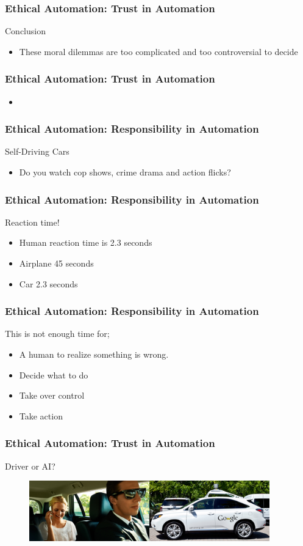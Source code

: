 \begin{frame}
	\frametitle{ Ethical Automation: Trust in Automation}
	{\Large Conclusion}
	\begin{itemize}
		\item These moral dilemmas are too complicated and too controversial to decide
	\end{itemize}
\end{frame}


\begin{frame}
	\frametitle{ Ethical Automation: Trust in Automation}
	\begin{itemize}
		\item
	\end{itemize}
\end{frame}


\begin{frame}
	\frametitle{ Ethical Automation: Responsibility in Automation}
	{\Large Self-Driving Cars}
	\begin{itemize}
		\item Do you watch cop shows, crime drama and action flicks?
	\end{itemize}
\end{frame}

\begin{frame}
	\frametitle{ Ethical Automation: Responsibility in Automation}
	{\Large Reaction time!}
	\begin{itemize}
		\item Human reaction time is 2.3 seconds
		\item Airplane 45 seconds
		\item Car 2.3 seconds
	\end{itemize}
\end{frame}

\begin{frame}
	\frametitle{ Ethical Automation: Responsibility in Automation}
	{\Large This is not enough time for;}
	\begin{itemize}
		\item A human to realize something is wrong.
		\item Decide what to do
		\item Take over control
		\item Take action
	\end{itemize}
\end{frame}

\begin{frame}
	\frametitle{ Ethical Automation: Trust in Automation}
	{\Large Driver or AI?}
	\begin{figure}[bht]
		\centering
		\includegraphics[width=4.1in]{diagrams/car}
		\caption{}
		\label{fig:-deg}
	\end{figure}
\end{frame}

